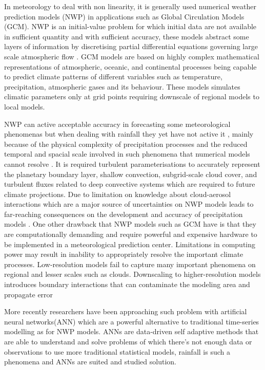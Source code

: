 In meteorology to deal with non linearity, it is generally used numerical weather prediction models (NWP) in applications such as Global Circulation Models (GCM). NWP is an initial-value problem for which initial data are not available in sufficient quantity and with sufficient accuracy, these models abstract some layers of information by discretising partial differential equations governing large scale atmospheric flow \cite{ghil1981applications}. GCM models are based on highly complex mathematical representations of atmospheric, oceanic, and continental processes being capable to predict climate patterns of different variables such as temperature, precipitation, atmospheric gases and its behaviour. These models simulates climatic parameters only at grid points requiring downscale of regional models to local models\cite{alotaibi2018future}. 

NWP can active acceptable accuracy in forecasting some meteorological phenomenas but when dealing with rainfall they yet have not active it \cite{ramirez2006linear}, mainly because of the physical complexity of precipitation processes and the reduced temporal and spacial scale involved in such phenomena that numerical models cannot resolve \cite{kuligowski1998localized}. It is required turbulent parameterisations to accurately represent the planetary boundary layer, shallow convection, subgrid-scale cloud cover, and turbulent fluxes related to deep convective systems which are required to future climate projections. Due to limitation on knowledge about cloud-aerosol interactions which are a major source of uncertainties on NWP models leads to far-reaching consequences on the development and accuracy of precipitation models \cite{prein2015review}. One other drawback that NWP models such as GCM have is that they are computationally demanding and require powerful and expensive hardware to be implemented in a meteorological prediction center.  Limitations in computing power may result in inability to appropriately resolve the important climate processes. Low-resolution models fail to capture many important phenomena on regional and lesser scales such as clouds. Downscaling to higher-resolution models introduces boundary interactions that can contaminate the modeling area and propagate error \cite{alotaibi2018future}

More recently researchers have been approaching such problem with artificial neural networks(ANN) which are a powerful alternative to traditional time-series modelling \cite{zhang1998linear} as for NWP models. ANNs are data-driven self adaptive methods that are able to understand and solve problems of which there's not enough data or observations to use more traditional statistical models\cite{zhang1998forecasting}, rainfall is such a phenomena and ANNs are suited and studied solution.

